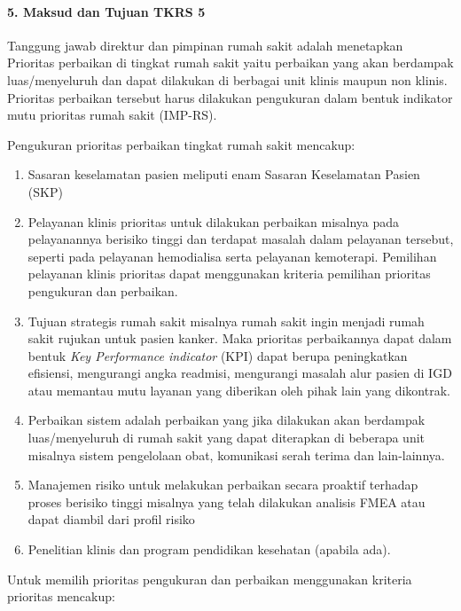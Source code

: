 \documentclass[
]{book}
\providecommand{\tightlist}{%
  \setlength{\itemsep}{0pt}\setlength{\parskip}{0pt}}
\begin{document}
\hypertarget{maksud-dan-tujuan-tkrs-5}{%
\paragraph*{5. Maksud dan Tujuan TKRS 5}\label{maksud-dan-tujuan-tkrs-5}}

Tanggung jawab direktur dan pimpinan rumah sakit adalah menetapkan Prioritas perbaikan di tingkat rumah sakit yaitu perbaikan yang akan berdampak luas/menyeluruh dan dapat dilakukan di berbagai unit klinis maupun non klinis. Prioritas perbaikan tersebut harus dilakukan pengukuran dalam bentuk indikator mutu prioritas rumah sakit (IMP-RS).

Pengukuran prioritas perbaikan tingkat rumah sakit mencakup:

\begin{enumerate}
\def\labelenumi{\alph{enumi}.}
\tightlist
\item
  Sasaran keselamatan pasien meliputi enam Sasaran Keselamatan Pasien (SKP)
\item
  Pelayanan klinis prioritas untuk dilakukan perbaikan misalnya pada pelayanannya berisiko tinggi dan terdapat masalah dalam pelayanan tersebut, seperti pada pelayanan hemodialisa serta pelayanan kemoterapi. Pemilihan pelayanan klinis prioritas dapat menggunakan kriteria pemilihan prioritas pengukuran dan perbaikan.
\item
  Tujuan strategis rumah sakit misalnya rumah sakit ingin menjadi rumah sakit rujukan untuk pasien kanker. Maka prioritas perbaikannya dapat dalam bentuk \emph{Key Performance indicator} (KPI) dapat berupa peningkatkan efisiensi, mengurangi angka readmisi, mengurangi masalah alur pasien di IGD atau memantau mutu layanan yang diberikan oleh pihak lain yang dikontrak.
\item
  Perbaikan sistem adalah perbaikan yang jika dilakukan akan berdampak luas/menyeluruh di rumah sakit yang dapat diterapkan di beberapa unit misalnya sistem pengelolaan obat, komunikasi serah terima dan lain-lainnya.
\item
  Manajemen risiko untuk melakukan perbaikan secara proaktif terhadap proses berisiko tinggi misalnya yang telah dilakukan analisis FMEA atau dapat diambil dari profil risiko
\item
  Penelitian klinis dan program pendidikan kesehatan (apabila ada).
\end{enumerate}

Untuk memilih prioritas pengukuran dan perbaikan menggunakan kriteria prioritas mencakup:
\end{document}
